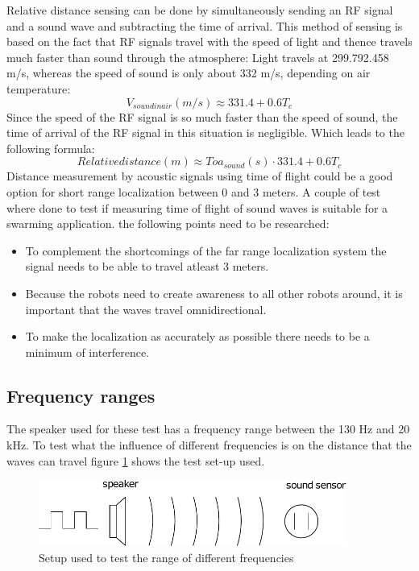 \documentclass[10pt,a4paper]{article}
\begin{document}
Relative distance sensing can be done by simultaneously sending an RF signal and a sound wave and subtracting the time of arrival.
This method of sensing is based on the fact that RF signals travel with the speed of light and thence travels much faster than sound through the atmosphere: Light travels at 299.792.458 m/s, whereas the speed of sound is only about 332 m/s, depending on air temperature:
\begin{equation}
\label{eq:speedsoundinair}
V_{sound in air}(m/s)\approx 331.4+0.6T_{c}
\end{equation}
Since the speed of the RF signal is so much faster than the speed of sound, the time of arrival of the RF signal in this situation is negligible. Which leads to the following formula:
\begin{equation}
Relative distance(m) \approx Toa_{sound}(s)\cdot  331.4+0.6T_{c}
\end{equation}
Distance measurement by acoustic signals using time of flight could be a good option for short range localization between 0 and 3 meters. A couple of test where done to test if measuring time of flight of sound waves is suitable for a swarming application. the following points need to be researched:
\begin{itemize}
\item To complement the shortcomings of the far range localization system the signal needs to be able to travel atleast 3 meters.
\item Because the robots need to create awareness to all other robots around, it is important that the waves travel omnidirectional. 
\item To make the localization as accurately as possible there needs to be a minimum of interference. 
\end{itemize}

\subsection{Frequency ranges}
The speaker used for these test has a frequency range between the 130 Hz and 20 kHz. To test what the influence of different frequencies is on the distance that the waves can travel figure \ref{setup1} shows the test set-up used.

\begin{figure}[H]
\centering
\includegraphics[width=0.9\textwidth]{situation1.pdf}
\caption{Setup used to test the range of different frequencies} 
\label{setup1}
\end{figure}
\end{document}
